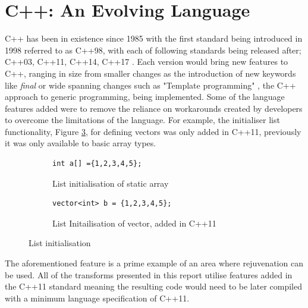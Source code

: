 \documentclass[bsc,frontabs,singlespacing,parskip,deptreport]{infthesis}
\begin{document}
\section{C++: An Evolving Language}
C++ has been in existence since 1985 with the first standard being introduced in 1998 referred to as C++98, with each of following standards being released after; C++03, C++11, C++14, C++17 \cite{CPP_VER}. Each version would bring new features to C++, ranging in size from smaller changes as the introduction of new keywords like \textit{final} or wide spanning changes such as "Template programming" \cite{TEMP_CPP}, the C++ approach to generic programming, being implemented. Some of the language features added were to remove the reliance on workarounds \cite{WORKARROUND_CPP} created by developers to overcome the limitations of the language. For example, the initialiser list functionality, Figure \ref{fig:vec-list}, for defining vectors was only added in C++11, previously it was only available to basic array types. 

\begin{figure}[H]
    \centering
    \begin{subfigure}[b]{0.5\textwidth}
        \begin{verbatim}
int a[] ={1,2,3,4,5};
        \end{verbatim}
        \caption{List initialisation of static array}
        \label{fig:vec-list-a}
    \end{subfigure}
    
    \begin{subfigure}[b]{0.5\textwidth}
        \begin{verbatim}
vector<int> b = {1,2,3,4,5};
        \end{verbatim}
        \caption{List Initailisation of vector, added in C++11}
        \label{fig:vec-list-b}
    \end{subfigure}
    \caption{List initialisation}
    \label{fig:vec-list}
\end{figure}

The aforementioned feature is a prime example of an area where rejuvenation can be used. All of the transforms presented in this report utilise features added in the C++11 standard meaning the resulting code would need to be later compiled with a minimum language specification of C++11. 

\end{document}
